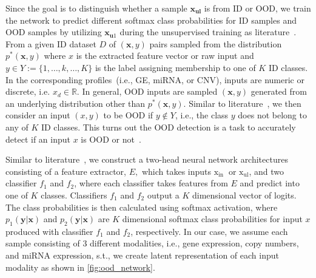 \hspace*{3.5mm} Since the goal is to distinguish whether a sample $\mathbf{x}_{\mathbf{ul}}$ is from ID or OOD, we train the network to predict different softmax class probabilities for ID samples and OOD samples by utilizing $\mathbf{x}_{\mathbf{u}1}$ during the unsupervised training as literature~\cite{OOD19}. From a given ID dataset ${D}$ of $(\boldsymbol{x}, y)$ pairs sampled from the distribution $p^{*}(\boldsymbol{x}, y)$ where $x$ is the extracted feature vector or raw input and $y \in {Y}:=\{1, \ldots, k, \ldots, K\}$ is the label assigning membership to one of $K$ ID classes. In the corresponding profiles~(i.e., GE, miRNA, or CNV), inputs are numeric or discrete, i.e. $x_{d} \in \mathbb{R}$. In general, OOD inputs are sampled $(\boldsymbol{x}, y)$ generated from an underlying distribution other than $p^{*}(\boldsymbol{x}, y)$. Similar to literature~\cite{OOD1}, we then consider an input $(x, y)$ to be OOD if $y \notin {Y}$, i.e., the class $y$ does not belong to any of $K$ ID classes. This turns out the OOD detection is a task to accurately detect if an input $x$ is OOD or not~\cite{OOD1,OOD2,OOD3}.

\hspace*{3.5mm} Similar to literature~\cite{yu2019unsupervised}, we construct a two-head neural network architectures consisting of a feature extractor, $E,$ which takes inputs $\mathrm{x}_{\text {in }}$ or $\mathrm{x}_{\mathrm{ul}}$, and two classifier $f_{1}$ and $f_{2}$, where each classifier takes features from $E$ and predict into one of $K$ classes. Classifiers $f_{1}$ and $f_{2}$ output a $K$ dimensional vector of logits. The class probabilities is then calculated using softmax activation, where $p_{1}(\mathbf{y} | \mathbf{x})$ and $p_{2}(\mathbf{y} | \mathbf{x})$ are $K$ dimensional softmax class probabilities for input $x$ produced with classifier $f_{1}$ and $f_{2}$, respectively. In our case, we assume each sample consisting of 3 different modalities, i.e., gene expression, copy numbers, and miRNA expression, s.t., we create latent representation of each input modality as shown in \cref{fig:ood_network}. 

